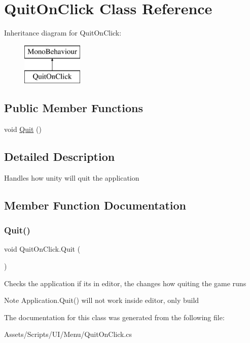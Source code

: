 \hypertarget{class_quit_on_click}{}\section{Quit\+On\+Click Class Reference}
\label{class_quit_on_click}
Inheritance diagram for Quit\+On\+Click\+:\begin{figure}[H]
\begin{center}
\leavevmode
\includegraphics[height=2.000000cm]{class_quit_on_click}
\end{center}
\end{figure}
\subsection*{Public Member Functions}
\begin{DoxyCompactItemize}
\item 
void \hyperlink{class_quit_on_click_a2ae4a389fc44a04218d7a1353bcc870a}{Quit} ()
\end{DoxyCompactItemize}


\subsection{Detailed Description}
Handles how unity will quit the application 

\subsection{Member Function Documentation}
\mbox{\label{class_quit_on_click_a2ae4a389fc44a04218d7a1353bcc870a}} 
\subsubsection{\texorpdfstring{Quit()}{Quit()}}
{\footnotesize\ttfamily void Quit\+On\+Click.\+Quit (\begin{DoxyParamCaption}{ }\end{DoxyParamCaption})}

Checks the application if its in editor, the changes how quiting the game runs \begin{DoxyNote}{Note}
Application.\+Quit() will not work inside editor, only build 
\end{DoxyNote}


The documentation for this class was generated from the following file\+:\begin{DoxyCompactItemize}
\item 
Assets/\+Scripts/\+U\+I/\+Menu/Quit\+On\+Click.\+cs\end{DoxyCompactItemize}
